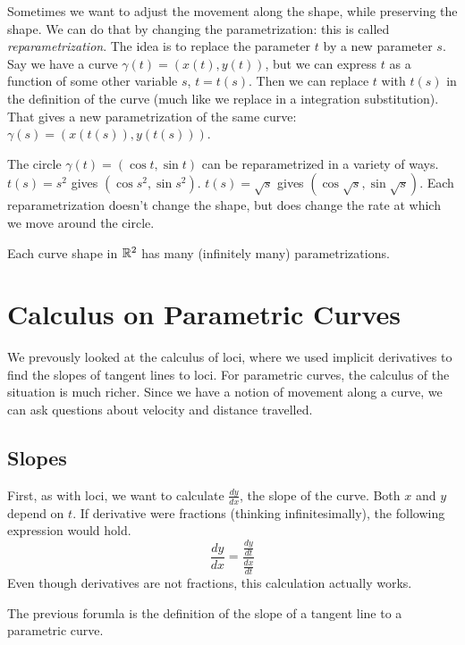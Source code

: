 \documentclass[fleqn]{report}
\begin{document}
Sometimes we want to adjust the movement along the shape,
while preserving the shape. We can do that by changing the
parametrization: this is called \emph{reparametrization}. The
idea is to replace the parameter $t$ by a new parameter $s$.
Say we have a curve $\gamma(t) = (x(t),y(t))$, but we can
express $t$ as a function of some other variable $s$, $t =
t(s)$. Then we can replace $t$ with $t(s)$ in the definition
of the curve (much like we replace in a integration
substitution). That gives a new parametrization of the same
curve: $\gamma(s) = (x(t(s)),y(t(s)))$. 

The circle $\gamma(t) = (\cos t, \sin t)$ can be
reparametrized in a variety of ways. $t(s) = s^2$ gives $(\cos
s^2, \sin s^2)$. $t(s) = \sqrt{s}$ gives $(\cos \sqrt{s}, \sin
\sqrt{s})$. Each reparametrization doesn't change the shape,
but does change the rate at which we move around the circle.

Each curve shape in $\mathbb{R}^2$ has many (infinitely many)
parametrizations.

\section{Calculus on Parametric Curves}
\label{parametric-curve-calculus}

We prevously looked at the calculus of loci, where we used
implicit derivatives to find the slopes of tangent lines to
loci. For parametric curves, the calculus of the situation is
much richer. Since we have a notion of movement along a
curve, we can ask questions about velocity and distance
travelled.

\subsection{Slopes}
\label{parametric-curves-slopes}

First, as with loci, we want to calculate $\frac{dy}{dx}$, the
slope of the curve. Both $x$ and $y$ depend on $t$. If
derivative were fractions (thinking infinitesimally), the
following expression would hold.
\begin{equation*}
\frac{dy}{dx} = \frac{\frac{dy}{dt}}{\frac{dx}{dt}}
\end{equation*}
Even though derivatives are not fractions, this calculation
actually works. 

\begin{defn}
The previous forumla is the definition of the slope of a
tangent line to a parametric curve.
\end{defn}
\end{document}

